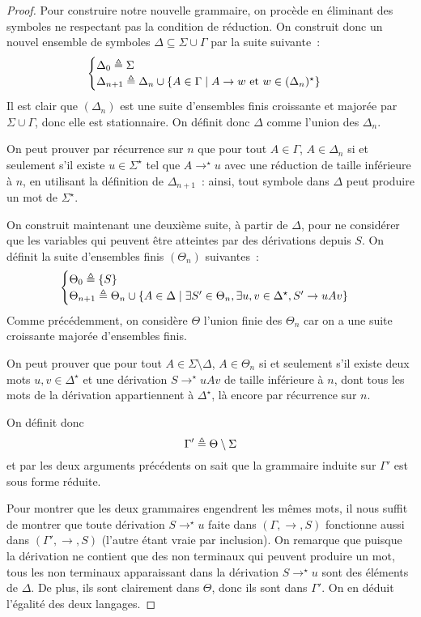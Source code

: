 \begin{proof}
  Pour construire notre nouvelle grammaire, on procède en éliminant des
  symboles ne respectant pas la condition de réduction. On construit donc un
  nouvel ensemble de symboles $\Delta \subseteq \Sigma\cup\Gamma$ par la suite
  suivante~:
  \[\begin{cases}
  \Delta_0 \triangleq \Sigma \\
  \Delta_{n+1} \triangleq \Delta_n \cup \{A \in \Gamma\mid A \to w \text{ et }
  w \in(\Delta_n)^\star\}
  \end{cases}\]
  Il est clair que $(\Delta_n)$ est une suite d'ensembles finis croissante et
  majorée par $\Sigma\cup \Gamma$, donc elle est stationnaire. On définit donc
  $\Delta$ comme l'union des $\Delta_n$.

  On peut prouver par récurrence sur $n$ que pour tout $A \in \Gamma$,
  $A \in \Delta_n$ si et seulement s'il existe $u \in \Sigma^\star$ tel que
  $A \to^\star u$ avec une réduction de taille inférieure à $n$, en utilisant la
  définition de $\Delta_{n+1}$~: ainsi, tout symbole dans $\Delta$ peut produire
  un mot de $\Sigma^\star$.

  On construit maintenant une deuxième suite, à partir de $\Delta$, pour
  ne considérer que les variables qui peuvent être atteintes par des dérivations
  depuis $S$. On définit la suite d'ensembles finis $(\Theta_n)$ suivantes~:
  \[\begin{cases}
  \Theta_0 \triangleq \{S\}\\
  \Theta_{n+1} \triangleq \Theta_n \cup
  \{A \in \Delta\mid \exists S' \in \Theta_n,
  \exists u,v \in \Delta^\star, S' \to uAv\}
  \end{cases}\]
  Comme précédemment, on considère $\Theta$ l'union finie des $\Theta_n$ car on
  a une suite croissante majorée d'ensembles finis.

  On peut prouver que pour tout $A \in \Sigma\setminus\Delta$, $A \in \Theta_n$
  si et seulement s'il existe deux mots $u,v \in \Delta^\star$ et une dérivation
  $S \to^\star uAv$ de taille inférieure à $n$, dont tous les mots de la
  dérivation appartiennent à $\Delta^\star$, là encore par récurrence sur $n$.

  On définit donc
  \[\Gamma' \triangleq \Theta\setminus \Sigma\]
  et par les deux arguments précédents on sait que la grammaire induite sur
  $\Gamma'$ est sous forme réduite.

  Pour montrer que les deux grammaires engendrent les mêmes mots, il nous suffit
  de montrer que toute dérivation $S \to^\star u$ faite dans $(\Gamma,\to,S)$
  fonctionne aussi dans $(\Gamma',\to,S)$ (l'autre étant vraie par inclusion).
  On remarque que puisque la dérivation ne contient que des non terminaux qui
  peuvent produire un mot, tous les non terminaux apparaissant dans la
  dérivation $S \to^\star u$ sont des éléments de $\Delta$. De plus, ils sont
  clairement dans $\Theta$, donc ils sont dans $\Gamma'$. On en déduit l'égalité
  des deux langages.
\end{proof}

